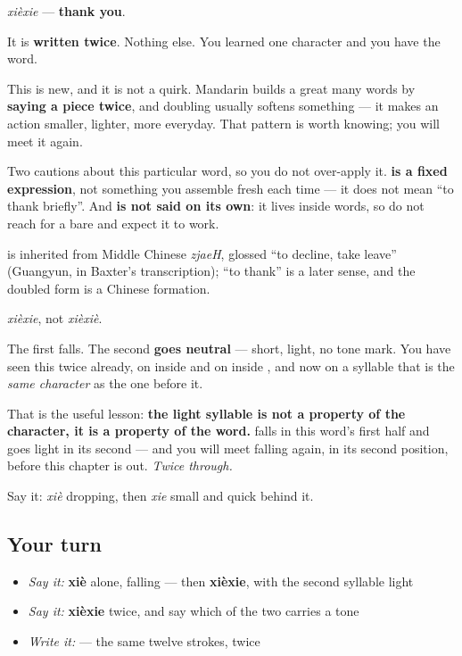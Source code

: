\begin{cousinweb}
\textbf{} \emph{xièxie} — \textbf{thank you}.

It is \textbf{ written twice}. Nothing else. You learned one character and you have the word.

This is new, and it is not a quirk. Mandarin builds a great many words by \textbf{saying a piece twice}, and doubling usually softens something — it makes an action smaller, lighter, more everyday. That pattern is worth knowing; you will meet it again.

Two cautions about this particular word, so you do not over-apply it. \textbf{ is a fixed expression}, not something you assemble fresh each time — it does not mean \textquotedblleft{}to thank briefly\textquotedblright{}. And \textbf{ is not said on its own}: it lives inside words, so do not reach for a bare  and expect it to work.

\textbf{} is inherited from Middle Chinese \emph{zjaeH}, glossed \textquotedblleft{}to decline, take leave\textquotedblright{} (Guangyun, in Baxter's transcription); \textquotedblleft{}to thank\textquotedblright{} is a later sense, and the doubled form is a Chinese formation.
\end{cousinweb}

\begin{sounds}
\emph{xièxie}, not \emph{xièxiè}.

The first  falls. The second \textbf{goes neutral} — short, light, no tone mark. You have seen this twice already, on  inside  and on  inside , and now on a syllable that is the \emph{same character} as the one before it.

That is the useful lesson: \textbf{the light syllable is not a property of the character, it is a property of the word.}  falls in this word's first half and goes light in its second — and you will meet  falling again, in its second position, before this chapter is out. \emph{Twice through.}

Say it: \emph{xiè} dropping, then \emph{xie} small and quick behind it.
\end{sounds}

\subsection*{Your turn}
\begin{itemize}
\raggedright
  \item \emph{Say it:} \textbf{xiè} alone, falling — then \textbf{xièxie}, with the second syllable light
  \item \emph{Say it:} \textbf{xièxie} twice, and say which of the two  carries a tone
  \item \emph{Write it:}  — the same twelve strokes, twice
\end{itemize}

